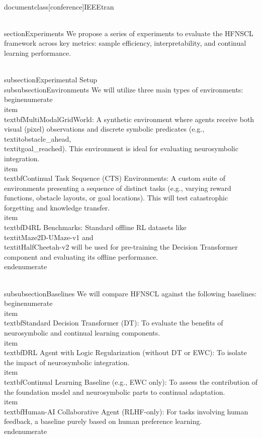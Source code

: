 \\documentclass[conference]{IEEEtran}
\begin{document}
\\section{Experiments}
We propose a series of experiments to evaluate the HFNSCL framework across key metrics: sample efficiency, interpretability, and continual learning performance.

\\subsection{Experimental Setup}
\\subsubsection{Environments}
We will utilize three main types of environments:
\\begin{enumerate}
    \\item \\textbf{MultiModalGridWorld}: A synthetic environment where agents receive both visual (pixel) observations and discrete symbolic predicates (e.g., \\textit{obstacle\_ahead}, \\textit{goal\_reached}). This environment is ideal for evaluating neurosymbolic integration.
    \\item \\textbf{Continual Task Sequence (CTS) Environments}: A custom suite of environments presenting a sequence of distinct tasks (e.g., varying reward functions, obstacle layouts, or goal locations). This will test catastrophic forgetting and knowledge transfer.
    \\item \\textbf{D4RL Benchmarks}: Standard offline RL datasets like \\textit{Maze2D-UMaze-v1} and \\textit{HalfCheetah-v2} will be used for pre-training the Decision Transformer component and evaluating its offline performance.
\\end{enumerate}

\\subsubsection{Baselines}
We will compare HFNSCL against the following baselines:
\\begin{enumerate}
    \\item \\textbf{Standard Decision Transformer (DT)}: To evaluate the benefits of neurosymbolic and continual learning components.
    \\item \\textbf{DRL Agent with Logic Regularization (without DT or EWC)}: To isolate the impact of neurosymbolic integration.
    \\item \\textbf{Continual Learning Baseline (e.g., EWC only)}: To assess the contribution of the foundation model and neurosymbolic parts to continual adaptation.
    \\item \\textbf{Human-AI Collaborative Agent (RLHF-only)}: For tasks involving human feedback, a baseline purely based on human preference learning.
\\end{enumerate}
\end{document}
